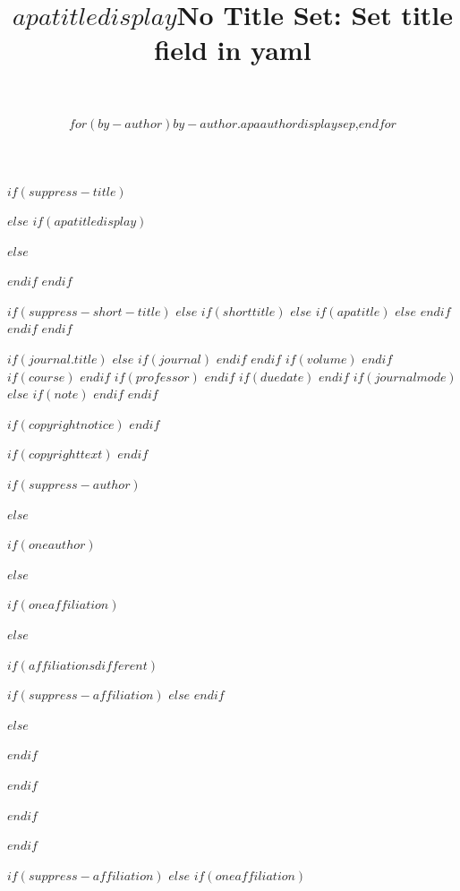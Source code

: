 $if(suppress-title)$
\title{}
$else$
$if(apatitledisplay)$
\title{$apatitledisplay$}
$else$
\title{No Title Set: Set title field in yaml}
$endif$
$endif$


$if(suppress-short-title)$
\shorttitle{}
$else$
$if(shorttitle)$
$else$
$if(apatitle)$
$else$
$endif$
$endif$
$endif$


\usepackage{etoolbox}


$if(journal.title)$
$else$
$if(journal)$
$endif$
$endif$
$if(volume)$
$endif$
$if(course)$
$endif$
$if(professor)$
$endif$
$if(duedate)$
$endif$
$if(journalmode)$
$else$
$if(note)$
$endif$
$endif$

$if(copyrightnotice)$
$endif$

$if(copyrighttext)$
$endif$

$if(suppress-author)$
\author{~}
$else$

$if(oneauthor)$
\author{$for(by-author)$$by-author.apaauthordisplay$$sep$,$endfor$}
$else$

$if(oneaffiliation)$


$else$

$if(affiliationsdifferent)$

$if(suppress-affiliation)$
$else$
$endif$


$else$


$endif$

$endif$

$endif$

$endif$

$if(suppress-affiliation)$
\affiliation{}
$else$
$if(oneaffiliation)$


